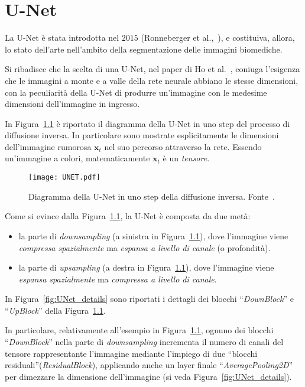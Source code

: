 \chapter{U-Net}\label{appendix:unet}

La U-Net è stata introdotta nel $2015$ (Ronneberger et al.,~\cite{ronnebergerUNet2015}), e costituiva, allora, 
lo stato dell'arte nell'ambito della segmentazione delle immagini biomediche.

Si ribadisce che la scelta di una U-Net, nel paper di Ho et al.~\cite{ho2020}, coniuga l'esigenza che le immagini 
a monte e a valle della rete neurale abbiano le stesse dimensioni, con la peculiarità della U-Net di produrre un'immagine 
con le medesime dimensioni dell'immagine in ingresso.

In Figura~\ref{fig:UNet} è riportato il diagramma della U-Net in uno step del processo di diffusione inversa. In particolare sono mostrate esplicitamente le dimensioni
dell'immagine rumorosa $\mathbf{x}_t$ nel suo percorso attraverso la rete. Essendo un'immagine a colori, matematicamente $\mathbf{x}_t$ è un \emph{tensore}.

\begin{figure}
    \centering
    \texttt{[image: UNET.pdf]}
    \caption{Diagramma della U-Net in uno step della diffusione inversa. Fonte~\cite{fosterGenerativeDeepLearning2023}.}
    \label{fig:UNet}
\end{figure}

Come si evince dalla Figura~\ref{fig:UNet}, la U-Net è composta da due metà:
\begin{itemize}
\item la parte di \emph{downsampling} (a sinistra in Figura~\ref{fig:UNet}), dove l'immagine viene 
\emph{compressa spazialmente} ma \emph{espansa a livello di canale} (o profondità).
\item la parte di \emph{upsampling} (a destra in Figura~\ref{fig:UNet}), dove l'immagine viene 
\emph{espansa spazialmente} ma \emph{compressa a livello di canale}.
\end{itemize}

\noindent In Figura~\ref{fig:UNet_details} sono riportati i dettagli dei blocchi “\emph{DownBlock}” e “\emph{UpBlock}” della 
Figura~\ref{fig:UNet}. 

In particolare, relativamente all'esempio in Figura~\ref{fig:UNet}, ognuno dei blocchi “\emph{DownBlock}” nella parte di \emph{downsampling} incrementa 
il numero di canali del tensore rappresentante l'immagine mediante l'impiego di due “blocchi residuali”(\emph{ResidualBlock}), 
applicando anche un layer finale “\emph{AveragePooling2D}” per dimezzare la dimensione dell'immagine (si veda Figura~\ref{fig:UNet_details}).

